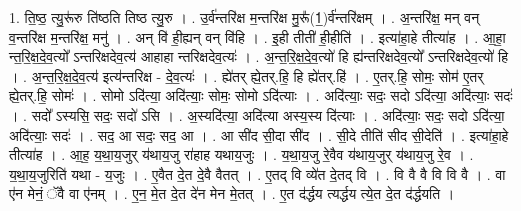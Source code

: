 \documentclass[17pt]{extarticle}
\begin{document}
1. ति॒ष्ठ॒ त्यु॒रू॑रु ति॑ष्ठति तिष्ठ त्यु॒रु । . उ॒र्व॑न्तरि॑क्ष म॒न्तरि॑क्ष मु॒रू᳚(1॒)र्व॑न्तरि॑क्षम् । . अ॒न्तरि॑क्ष॒ मन् वन् व॒न्तरि॑क्ष म॒न्तरि॑क्ष॒ मनु॑ । . अन् वि॑ ही॒ह्यन् वन् वि॑हि । . इ॒ही तीती॑ ही॒हीति॑ । . इत्या॑हा॒हे तीत्या॑ह । . आ॒हा॒ न्त॒रि॒क्ष॒दे॒व॒त्यो᳚ ऽन्तरिक्षदेव॒त्य॑ आहाहा न्तरिक्षदेव॒त्यः॑ । . अ॒न्त॒रि॒क्ष॒दे॒व॒त्यो॑ हि ह्य॑न्तरिक्षदेव॒त्यो᳚ ऽन्तरिक्षदेव॒त्यो॑ हि । . अ॒न्त॒रि॒क्ष॒दे॒व॒त्य॑ इत्य॑न्तरिक्ष - दे॒व॒त्यः॑ । . ह्ये॑तर् ह्ये॒तर्.हि॒ हि ह्ये॑तर्.हि॑ । . ए॒तर्.हि॒ सोमः॒ सोम॑ ए॒तर् ह्ये॒तर्.हि॒ सोमः॑ । . सोमो ऽदि॑त्या॒ अदि॑त्याः॒ सोमः॒ सोमो ऽदि॑त्याः । . अदि॑त्याः॒ सदः॒ सदो ऽदि॑त्या॒ अदि॑त्याः॒ सदः॑ । . सदो᳚ ऽस्यसि॒ सदः॒ सदो॑ ऽसि । . अ॒स्यदि॑त्या॒ अदि॑त्या अस्य॒स्य दि॑त्याः । . अदि॑त्याः॒ सदः॒ सदो ऽदि॑त्या॒ अदि॑त्याः॒ सदः॑ । . सद॒ आ सदः॒ सद॒ आ । . आ सी॑द सी॒दा सी॑द । . सी॒दे तीति॑ सीद सी॒देति॑ । . इत्या॑हा॒हे तीत्या॑ह । . आ॒ह॒ य॒था॒य॒जुर् य॑थाय॒जु रा॑हाह यथाय॒जुः । . य॒था॒य॒जु रे॒वैव य॑थाय॒जुर् य॑थाय॒जु रे॒व । . य॒था॒य॒जुरिति॑ यथा - य॒जुः । . ए॒वैत दे॒त दे॒वै वैतत् । . ए॒तद् वि व्ये॑त दे॒तद् वि । . वि वै वै वि वि वै । . वा ए॑न मेनं॒ ॅवै वा ए॑नम् । . ए॒न॒ मे॒त दे॒त दे॑न मेन मे॒तत् । . ए॒त द॑र्द्धय त्यर्द्धय त्ये॒त दे॒त द॑र्द्धयति । \newline
\end{document}
